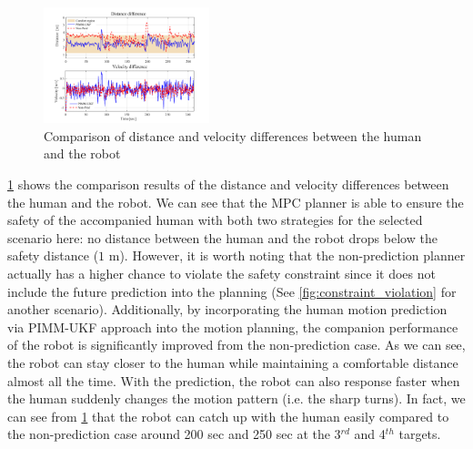 \documentclass[journal]{IEEEtran}
\begin{document}
\begin{figure}
\centering	\includegraphics[width=0.43\textwidth]{figures/diff}
		\caption{Comparison of distance and velocity differences between the human and the robot}
		\label{fig:err_d}
\end{figure}
	\cref{fig:err_d} shows the comparison results of the distance and velocity differences between the human and the robot.
    We can see that the MPC planner is able to ensure the safety of the accompanied human with both two strategies for the selected scenario here: no distance between the human and the robot drops below the safety distance ($1$ m). 
    However, it is worth noting that the non-prediction planner actually has a higher chance to violate the safety constraint since it does not include the future prediction into the planning (See \cref{fig:constraint_violation} for another scenario).   
	Additionally, by incorporating the human motion prediction via PIMM-UKF approach into the motion planning, the companion performance of the robot is significantly improved from the non-prediction case. As we can see, the robot can stay closer to the human while maintaining a comfortable distance almost all the time.
    With the prediction, the robot can also response faster when the human suddenly changes the motion pattern (i.e. the sharp turns). In fact, we can see from \cref{fig:err_d} that the robot can catch up with the human easily compared to the non-prediction case around 200 sec and 250 sec at the 3$^{rd}$ and 4$^{th}$ targets. %
    
\end{document}
